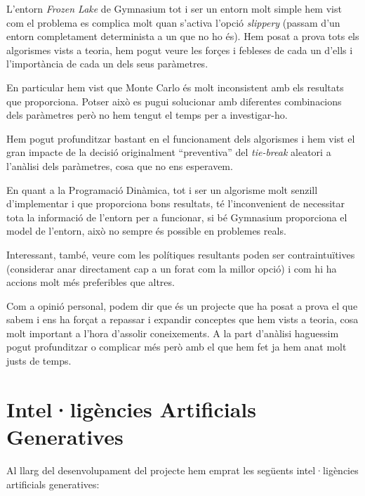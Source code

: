 \documentclass[12pt,a4paper]{report}
\begin{document}
L'entorn \textit{Frozen Lake} de Gymnasium tot i ser un entorn molt simple hem vist com el problema es complica
molt quan s'activa l'opció \textit{slippery} (passam d'un entorn completament determinista a un que no ho és).
Hem posat a prova tots els algorismes vists a teoria, hem pogut veure les forçes i febleses de cada un d'ells
i l'importància de cada un dels seus paràmetres.

En particular hem vist que Monte Carlo és molt inconsistent amb els resultats que proporciona. Potser això es pugui
solucionar amb diferentes combinacions dels paràmetres però no hem tengut el temps per a investigar-ho.

Hem pogut profunditzar bastant en el funcionament dels algorismes i hem vist el gran impacte de la decisió originalment
``preventiva'' del \textit{tie-break} aleatori a l'anàlisi dels paràmetres, cosa que no ens esperavem.

En quant a la Programació Dinàmica, tot i ser un algorisme molt senzill d'implementar i que proporciona
bons resultats, té l'inconvenient de necessitar tota la informació de l'entorn per a funcionar, si bé Gymnasium
proporciona el model de l'entorn, això no sempre és possible en problemes reals.

Interessant, també, veure com les polítiques resultants poden ser contraintuïtives (considerar anar directament
cap a un forat com la millor opció) i com hi ha accions molt més preferibles que altres.

Com a opinió personal, podem dir que és un projecte que ha posat a prova el que sabem i ens ha forçat
a repassar i expandir conceptes que hem vists a teoria, cosa molt important a l'hora d'assolir coneixements.
A la part d'anàlisi haguessim pogut profunditzar o complicar més però amb el que hem fet ja hem anat molt justs de temps.

\chapter{Intel·ligències Artificials Generatives}
\label{ch:conclusion}

Al llarg del desenvolupament del projecte hem emprat les següents intel·ligències artificials generatives:
\end{document}
